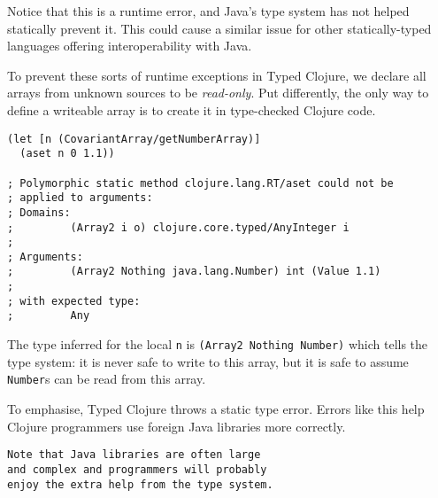Notice that this is a runtime error, and Java's type system has not helped
statically prevent it.
This could cause a similar issue for other statically-typed languages offering
interoperability with Java. 

To prevent these sorts of runtime exceptions in Typed Clojure, we declare
all arrays from unknown sources to be \emph{read-only}. Put differently,
the only way to define a writeable array is to create it in type-checked Clojure
code.

\begin{lstlisting}
(let [n (CovariantArray/getNumberArray)]
  (aset n 0 1.1))

; Polymorphic static method clojure.lang.RT/aset could not be 
; applied to arguments:
; Domains: 
;         (Array2 i o) clojure.core.typed/AnyInteger i
; 
; Arguments:
;         (Array2 Nothing java.lang.Number) int (Value 1.1)
; 
; with expected type:
;         Any
\end{lstlisting}

The type inferred for the local \lstinline|n| is \lstinline|(Array2 Nothing Number)|
which tells the type system: it is never safe to write to this array, but
it is safe to assume \lstinline|Number|s can be read from this array.

To emphasise, Typed Clojure throws a static type error. Errors like this help Clojure programmers
use foreign Java libraries more correctly.

\begin{verbatim}
Note that Java libraries are often large 
and complex and programmers will probably
enjoy the extra help from the type system.
\end{verbatim}
